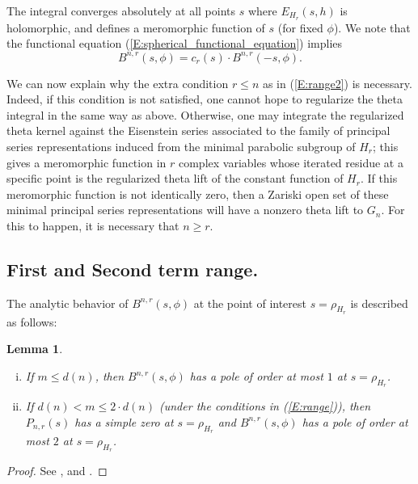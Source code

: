 \documentclass[10pt]{amsart}
\theoremstyle{plain}
\newtheorem{Lem}[equation]{Lemma}
\numberwithin{equation}{section}
\begin{document}
The integral converges absolutely at all points $s$ where
$E_{H_r}(s,h)$ is holomorphic, and defines a meromorphic function of
$s$ (for fixed $\phi$). We note that the functional equation
(\ref{E:spherical_functional_equation}) implies
\begin{equation} \label{E:B}
  B^{n,r}(s, \phi)  = c_r(s)  \cdot B^{n,r}(-s, \phi). 
\end{equation}
 
 \vskip 5pt
 
 We can now  explain why the extra condition $r\leq n$ as in
 (\ref{E:range2}) is necessary. Indeed, if this condition is not
 satisfied, one cannot hope to regularize the theta integral in the same way as above.  
 Otherwise, one may integrate the regularized theta
 kernel against the Eisenstein series associated to 
the family of principal series representations induced from the
minimal parabolic subgroup of $H_r$; this gives a meromorphic function
in $r$ complex variables whose iterated residue at a specific point is
the regularized theta lift of the constant function of $H_r$. 
If this meromorphic function is not identically zero, then a Zariski open set of these
minimal principal series representations will have a nonzero theta lift
to $G_n$. For this to happen, it is necessary that $n \geq r$.
\vskip 10pt

 \subsection{\bf First and Second term range.}
 The analytic behavior of $B^{n,r}(s, \phi)$ at the point of interest
 $s = \rho_{H_r}$ is described as follows:
  \vskip 5pt
 
 
 \begin{Lem}
\begin{enumerate}[(i)]
\item If $m \leq d(n)$, then $B^{n,r}(s, \phi)$ has a pole of order at
  most $1$  at $s = \rho_{H_r}$. 
\vskip 5pt
\item  If $d(n) <  m \leq 2 \cdot d(n) $ (under the conditions in  (\ref{E:range})), then $P_{n,r}(s)$ has a
  simple zero at  $s = \rho_{H_r}$ and $B^{n,r}(s, \phi)$ has a pole of
  order at most $2$ at $s = \rho_{H_r}$. 
\end{enumerate}
\end{Lem}
\begin{proof}
See \cite[Lemma 5.5.6]{KR5},  \cite[Lemma 2.2]{I2} and \cite[\S 2]{T1}.
\end{proof}
\vskip 5pt
\end{document}

